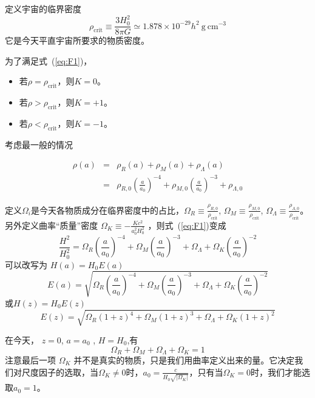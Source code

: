 \documentclass[12pt]{ctexart}
\newcommand{\refeq}[1]{式~(\ref{#1})}
\begin{document}
定义宇宙的临界密度
\begin{equation}
    \rho_\text{crit} \equiv \frac{3H_0^2}{8\pi G} \simeq 1.878\times 10^{-29} h^2 \mathrm{~g~cm^{-3}}
\end{equation}
它是今天平直宇宙所要求的物质密度。


为了满足\refeq{eq:F1}，
\begin{itemize}
    \item 若$\rho=\rho_\text{crit}$，则$K=0$。
    \item 若$\rho>\rho_\text{crit}$，则$K=+1$。
    \item 若$\rho<\rho_\text{crit}$，则$K=-1$。
\end{itemize}

考虑最一般的情况

\begin{eqnarray}
    \rho(a) &=& \rho_R(a) + \rho_M(a) + \rho_\Lambda (a) \label{eq:rho}
    \\ &=& \rho_{R,0}\left(\frac{a}{a_0}\right)^{-4} + \rho_{M,0}\left(\frac{a}{a_0}\right)^{-3}  + \rho_{\Lambda,0}     
\end{eqnarray}

定义$\Omega_i$是今天各物质成分在临界密度中的占比，$\Omega_R\equiv\frac{\rho_{R,0}}{\rho_\text{crit}}$, $\Omega_M\equiv\frac{\rho_{M,0}}{\rho_\text{crit}}$, $\Omega_\Lambda\equiv\frac{\rho_{\Lambda,0}}{\rho_\text{crit}}$。
另外定义曲率“质量”密度 $\Omega_K \equiv -\frac{K c^2}{a_0^2 H_0^2}$ ，则\refeq{eq:F1}变成
\begin{equation}
    \frac{H^2}{H_0^2} = \Omega_R \left(\frac{a}{a_0}\right)^{-4} + \Omega_M \left(\frac{a}{a_0}\right)^{-3} + \Omega_\Lambda + \Omega_K \left(\frac{a}{a_0}\right)^{-2}
\end{equation}
可以改写为 $H(a)=H_0 E(a)$
\begin{equation}
    E(a) = \sqrt{ \Omega_R \left(\frac{a}{a_0}\right)^{-4} + \Omega_M \left(\frac{a}{a_0}\right)^{-3} + \Omega_\Lambda + \Omega_K \left(\frac{a}{a_0}\right)^{-2} }
\end{equation}
或$H(z)=H_0 E(z)$
\begin{equation}
    E(z) = \sqrt{ \Omega_R \left(1+z\right)^{4} + \Omega_M \left(1+z\right)^{3} + \Omega_\Lambda + \Omega_K \left(1+z\right)^{2} }
\end{equation}

在今天， $z=0$, $a=a_0$ , $H=H_0$,有
\begin{equation}
    \Omega_R + \Omega_M + \Omega_\Lambda + \Omega_K = 1 \label{eq:allOmega}
\end{equation}
注意最后一项 $\Omega_K$ 并不是真实的物质，只是我们用曲率定义出来的量。它决定我们对尺度因子的选取，当$\Omega_K\neq 0$时，$a_0=\frac{c}{H_0\sqrt{|\Omega_K|}}$，只有当$\Omega_K = 0$时，我们才能选取$a_0=1$。
\end{document}
